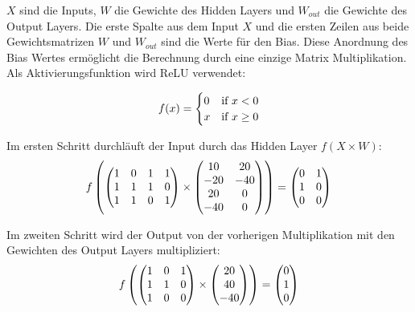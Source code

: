 $ X $ sind die Inputs, $ W $ die Gewichte des Hidden Layers und $ W_{out} $ die Gewichte des Output Layers.
Die erste Spalte aus dem Input $ X $ und die ersten Zeilen aus beide Gewichtsmatrizen $ W $ und $ W_{out} $ sind die Werte für den Bias.
Diese Anordnung des Bias Wertes ermöglicht die Berechnung durch eine einzige Matrix Multiplikation. Als Aktivierungsfunktion wird ReLU 
\cite{10.5555/3104322.3104425} verwendet:

\begin{equation}
  \vspace{5pt}
  f(x) = 
  \begin{cases}
    0 &\text{if \(x < 0\)}  \\
    x &\text{if \(x \geq 0\)} 
  \end{cases}
\end{equation}

Im ersten Schritt durchläuft der Input durch das Hidden Layer $ f(X \times W) $:
\begin{equation}
  \vspace{5pt}
  f \left(
  \begin{pmatrix}
    1 &0 &1 &1 \\
    1 &1 &1 &0 \\
    1 &1 &0 &1
  \end{pmatrix}
  \times
  \begin{pmatrix}
    10 &20 \\
    -20 &-40 \\
    20 &0 \\
    -40 &0
  \end{pmatrix}
  \right)
  =
  \begin{pmatrix}
    0 &1 \\
    1 &0 \\
    0 &0
  \end{pmatrix}
\end{equation}

Im zweiten Schritt wird der Output von der vorherigen Multiplikation mit den Gewichten des Output Layers multipliziert:
\begin{equation}
  \vspace{5pt}
  f \left(
  \begin{pmatrix}
    1 &0 &1 \\
    1 &1 &0 \\
    1 &0 &0
  \end{pmatrix}
  \times
  \begin{pmatrix}
    20 \\
    40 \\
    -40
  \end{pmatrix}
  \right)
  =
  \begin{pmatrix}
    0 \\
    1 \\
    0
  \end{pmatrix}
\end{equation}

